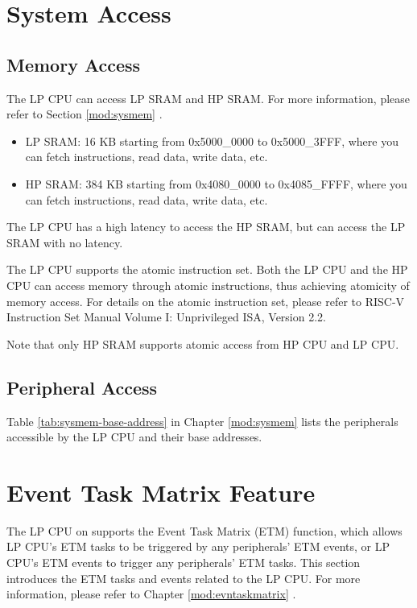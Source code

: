 \documentclass[main\_\_EN.tex]{subfiles}
\begin{document}
\section{System Access}


\subsection{Memory Access}

The \chipname{} LP CPU can access LP SRAM and HP SRAM. For more information, please refer to Section \ref{mod:sysmem} \textit{}.
\begin{itemize}
    \item LP SRAM: 16 KB starting from 0x5000\_0000 to 0x5000\_3FFF, where you can fetch instructions, read data, write data, etc.
    \item HP SRAM: 384 KB starting from 0x4080\_0000 to 0x4085\_FFFF, where you can fetch instructions, read data, write data, etc.
\end{itemize}

\begin{tiplisting}
The LP CPU has a high latency to access the HP SRAM, but can access the LP SRAM with no latency.
\end{tiplisting}

The LP CPU supports the atomic instruction set. Both the LP CPU and the HP CPU can access memory through atomic instructions, thus achieving atomicity of memory access. For details on the atomic instruction set, please refer to RISC-V Instruction Set Manual Volume I: Unprivileged ISA, Version 2.2.

Note that only HP SRAM supports atomic access from HP CPU and LP CPU.

\subsection{Peripheral Access}

Table \ref{tab:sysmem-base-address} in Chapter \ref{mod:sysmem} \textit{} lists the peripherals accessible by the LP CPU and their base addresses.

\section{Event Task Matrix Feature}
\label{sec:etm-func}

The LP CPU on \chipname{} supports the Event Task Matrix (ETM) function, which allows LP CPU's ETM tasks to be triggered by any peripherals' ETM events, or LP CPU's ETM events to trigger any peripherals' ETM tasks. This section introduces the ETM tasks and events related to the LP CPU. For more information, please refer to Chapter \ref{mod:evntaskmatrix} .
\end{document}
